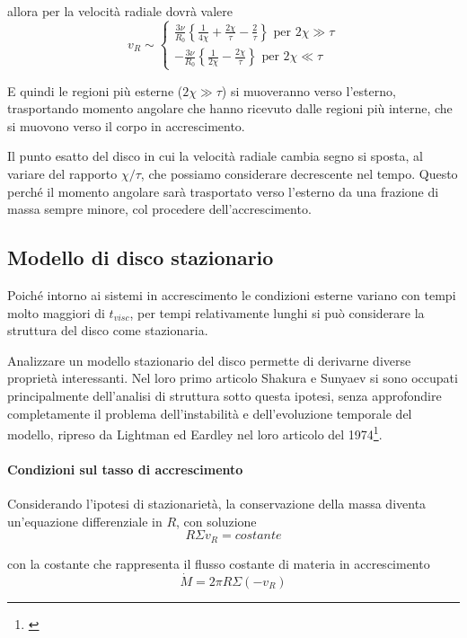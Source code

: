 \documentclass[a4paperbi]{article}
\begin{document}
	allora per la velocità radiale dovrà valere
	\begin{equation*}
		v_R\sim\begin{cases}
			\frac{3\nu}{R_0}\left\{\frac{1}{4\chi}+\frac{2\chi}{\tau}-\frac{2}{\tau}\right\}\text{ per $2\chi\gg\tau$}\\
			-\frac{3\nu}{R_0}\left\{\frac{1}{2\chi}-\frac{2\chi}{\tau}\right\}\text{ per $2\chi\ll\tau$}			
			\end{cases}
	\end{equation*}
	
	E quindi le regioni più esterne ($2\chi\gg\tau$) si muoveranno verso l'esterno, trasportando momento angolare che hanno ricevuto dalle regioni più interne, che si muovono verso il corpo in accrescimento.
	
	Il punto esatto del disco in cui la velocità radiale cambia segno si sposta, al variare del rapporto $\chi/\tau$, che possiamo considerare decrescente nel tempo. Questo perché il momento angolare sarà trasportato verso l'esterno da una frazione di massa sempre minore, col procedere dell'accrescimento.
	
\subsection{Modello di disco stazionario}
	Poiché intorno ai sistemi in accrescimento le condizioni esterne variano con tempi molto maggiori di $t_{visc}$, per tempi relativamente lunghi si può considerare la struttura del disco come stazionaria.
	
	Analizzare un modello stazionario del disco permette di derivarne diverse proprietà interessanti. Nel loro primo articolo Shakura e Sunyaev si sono occupati principalmente dell'analisi di struttura sotto questa ipotesi, senza approfondire completamente il problema dell'instabilità e dell'evoluzione temporale del modello, ripreso da Lightman ed Eardley nel loro articolo del 1974\footnote{\cite{LightmanEardley1974}}.
	
	\paragraph{Condizioni sul tasso di accrescimento}
	Considerando l'ipotesi di stazionarietà, la conservazione della massa diventa un'equazione differenziale in $R$, con soluzione
	\begin{equation}
		R\Sigma v_R=costante
	\end{equation}
	
	con la costante che rappresenta il flusso costante di materia in accrescimento
	\begin{equation}
		\dot{M}=2\pi R\Sigma(-v_R)
	\end{equation}
	
\end{document}
